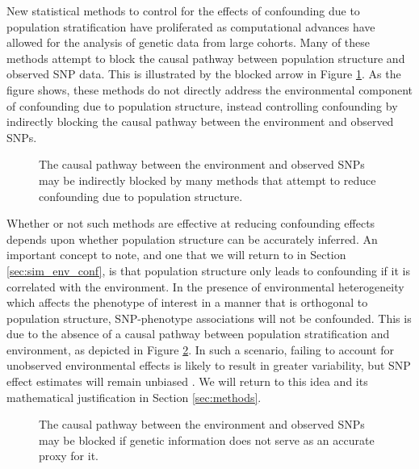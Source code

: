 New statistical methods to control for the effects of confounding due to population stratification have proliferated as computational advances have allowed for the analysis of genetic data from large cohorts. Many of these methods attempt to block the causal pathway between population structure and observed SNP data. This is illustrated by the blocked arrow in Figure \ref{fig:ps_env_block}. As the figure shows, these methods do not directly address the environmental component of confounding due to population structure, instead controlling confounding by indirectly blocking the causal pathway between the environment and observed SNPs. 

\begin{figure}[H]
\centering
{}
\caption{The causal pathway between the environment and observed SNPs may be indirectly blocked by many methods that attempt to reduce confounding due to population structure.}
\label{fig:ps_env_block}
\end{figure}

Whether or not such methods are effective at reducing confounding effects depends upon whether population structure can be accurately inferred. An important concept to note, and one that we will return to in Section \ref{sec:sim_env_conf}, is that population structure only leads to confounding if it is correlated with the environment.
In the presence of environmental heterogeneity which affects the phenotype of interest in a manner that is orthogonal to population structure, SNP-phenotype associations will not be confounded. This is due to the absence of a causal pathway between population stratification and environment, as depicted in Figure \ref{fig:ps_env_block2}. In such a scenario, failing to account for unobserved environmental effects is likely to result in greater variability, but SNP effect estimates will remain unbiased \citep{greenland1999causal}. We will return to this idea and its mathematical justification in Section \ref{sec:methods}. 

\begin{figure}[H]
\centering
{}
\caption{The causal pathway between the environment and observed SNPs may be blocked if genetic information does not serve as an accurate proxy for it.}
\label{fig:ps_env_block2}
\end{figure}

